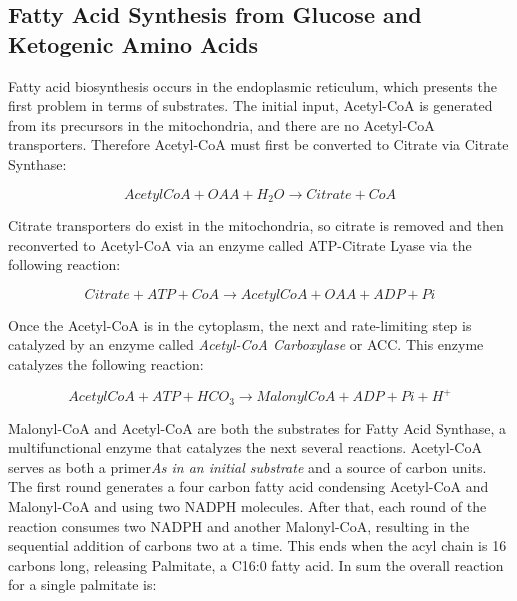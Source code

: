 \documentclass{tufte-handout}
\begin{document}
\subsection{Fatty Acid Synthesis from Glucose and Ketogenic Amino Acids}

Fatty acid biosynthesis occurs in the endoplasmic reticulum, which presents the first problem in terms of substrates.  The initial input, Acetyl-CoA is generated from its precursors in the mitochondria, and there are no Acetyl-CoA transporters.  Therefore Acetyl-CoA must first be converted to Citrate via Citrate Synthase:

\begin{equation}\label{eq:acl}
AcetylCoA + OAA + H_2O \rightarrow Citrate + CoA
\end{equation}

Citrate transporters do exist in the mitochondria, so citrate is removed and then reconverted to Acetyl-CoA via an enzyme called ATP-Citrate Lyase via the following reaction:

\begin{equation}\label{eq:acl}
Citrate + ATP + CoA \rightarrow AcetylCoA + OAA + ADP + Pi
\end{equation}

Once the Acetyl-CoA is in the cytoplasm, the next and rate-limiting step is catalyzed by an enzyme called \emph{Acetyl-CoA Carboxylase} or ACC.  This enzyme catalyzes the following reaction:

\begin{equation}\label{eq:acc}
AcetylCoA + ATP + HCO_3 \rightarrow MalonylCoA + ADP + Pi + H^+
\end{equation}

Malonyl-CoA and Acetyl-CoA are both the substrates for Fatty Acid Synthase, a multifunctional enzyme that catalyzes the next several reactions.  Acetyl-CoA serves as both a primer\emph{As in an initial substrate} and a source of carbon units.  The first round generates a four carbon fatty acid condensing Acetyl-CoA and Malonyl-CoA and using two NADPH molecules.  After that, each round of the reaction consumes two NADPH and another Malonyl-CoA, resulting in the sequential addition of carbons two at a time.  This ends when the acyl chain is 16 carbons long, releasing Palmitate, a C16:0 fatty acid.  In sum the overall reaction for a single palmitate is:
\end{document}
